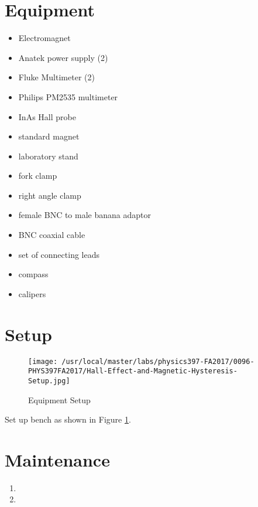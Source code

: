 \section{Equipment}
\begin{minipage}[t]{0.5\textwidth}
\begin{itemize}[noitemsep]
\item Electromagnet
\item Anatek power supply (2)
\item Fluke Multimeter (2)  %
\item Philips PM2535 multimeter
\item InAs Hall probe
\item standard magnet
\item laboratory stand
\item fork clamp
\end{itemize}
\end{minipage}
\begin{minipage}[t]{0.5\textwidth}
\begin{itemize}[noitemsep]
\item right angle clamp
\item female BNC to male banana adaptor
\item BNC coaxial cable
\item set of connecting leads
\item compass
\item calipers
\end{itemize}
\end{minipage}

\section{Setup}
\begin{figure}[!ht]
  \center
  \texttt{[image: /usr/local/master/labs/physics397-FA2017/0096-PHYS397FA2017/Hall-Effect-and-Magnetic-Hysteresis-Setup.jpg]}
  \caption{Equipment Setup}
  \label{pic:HMSetup}
\end{figure}
Set up bench as shown in Figure \ref{pic:HMSetup}.


\section{Maintenance}
\begin{enumerate}
\item 
\item 
\end{enumerate}



